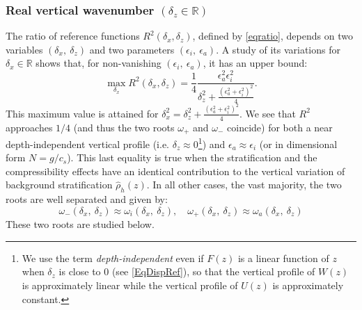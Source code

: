 \documentclass[a4paper,11pt]{article}
\begin{document}
\subsubsection{Real vertical wavenumber $(\delta_z\in\mathbb{R})$}
\label{realwavenumber}

The ratio of reference functions $\displaystyle R^2(\delta_x,\delta_z)$, defined by \ref{eqratio}, depends on two variables $(\delta_x,\ \delta_z)$ and two parameters $(\epsilon_i,\ \epsilon_a)$. A study of its variations for $\delta_x \in \mathbb{R}$ shows that, for non-vanishing $(\epsilon_i,\ \epsilon_a)$, it has an upper bound:
%
\begin{equation}
	 \max_{\delta_x} R^2(\delta_x,\delta_z) =\frac{1}{4}
	\frac{\epsilon_a^2\epsilon_i^2}{\delta_z^2+\frac{\left
	(\epsilon_a^2+\epsilon_i^2
	\right)^2}{4}}.
\label{boundR2}
\end{equation}
%
This maximum value is attained for $\delta_x^2=\delta_z^2+\frac{(\epsilon_a^2+\epsilon_i^2)^2}{4}$.
We see that $R^2$ approaches $1/4$ (and thus the two roots $\omega_+$ and $\omega_-$ coincide) for both a near depth-independent vertical profile (i.e. $\delta_z \approx 0$\footnote{We use the term {\it depth-independent} even if $F(z)$ is a linear function of $z$ when $\delta_z$ is close to $0$ (see \ref{EqDispRef}), so that the vertical profile of $W(z)$ is approximately linear while the vertical profile of $U(z)$ is approximately constant.}) and $\epsilon_a \approx \epsilon_i$ (or in dimensional form $N=g/c_s$). This last equality is true when the stratification and the compressibility effects have an identical contribution to the vertical variation of background stratification $\hat{\rho}_h(z)$. In all other cases, the vast majority, the two roots are well separated and given by:
\begin{equation}
\omega_{-}(\delta_x,\ \delta_z) \approx \omega_i
(\delta_x,\ \delta_z), \quad
\omega_{+}(\delta_x,\ \delta_z) \approx \omega_a(\delta_x,\ \delta_z)
\end{equation}
These two roots are studied below.
\end{document}
